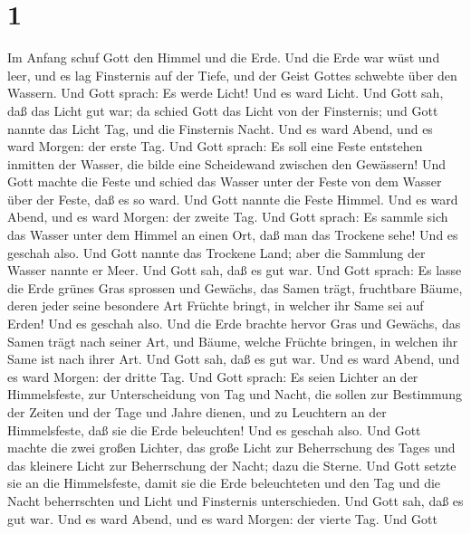 \hypertarget{section}{%
\section{1}\label{section}}

 Im Anfang schuf Gott den Himmel und die Erde.
 Und die Erde war wüst und leer, und es lag Finsternis auf
der Tiefe, und der Geist Gottes schwebte über den Wassern.
 Und Gott sprach: Es werde Licht! Und es ward Licht.
 Und Gott sah, daß das Licht gut war; da schied Gott das
Licht von der Finsternis;  und Gott nannte das Licht Tag,
und die Finsternis Nacht. Und es ward Abend, und es ward Morgen: der
erste Tag.  Und Gott sprach: Es soll eine Feste entstehen
inmitten der Wasser, die bilde eine Scheidewand zwischen den Gewässern!
 Und Gott machte die Feste und schied das Wasser unter der
Feste von dem Wasser über der Feste, daß es so ward.  Und
Gott nannte die Feste Himmel. Und es ward Abend, und es ward Morgen: der
zweite Tag.  Und Gott sprach: Es sammle sich das Wasser
unter dem Himmel an einen Ort, daß man das Trockene sehe! Und es geschah
also.  Und Gott nannte das Trockene Land; aber die
Sammlung der Wasser nannte er Meer. Und Gott sah, daß es gut war.
 Und Gott sprach: Es lasse die Erde grünes Gras sprossen
und Gewächs, das Samen trägt, fruchtbare Bäume, deren jeder seine
besondere Art Früchte bringt, in welcher ihr Same sei auf Erden! Und es
geschah also.  Und die Erde brachte hervor Gras und
Gewächs, das Samen trägt nach seiner Art, und Bäume, welche Früchte
bringen, in welchen ihr Same ist nach ihrer Art. Und Gott sah, daß es
gut war.  Und es ward Abend, und es ward Morgen: der
dritte Tag.  Und Gott sprach: Es seien Lichter an der
Himmelsfeste, zur Unterscheidung von Tag und Nacht, die sollen zur
Bestimmung der Zeiten und der Tage und Jahre dienen,  und
zu Leuchtern an der Himmelsfeste, daß sie die Erde beleuchten! Und es
geschah also.  Und Gott machte die zwei großen Lichter,
das große Licht zur Beherrschung des Tages und das kleinere Licht zur
Beherrschung der Nacht; dazu die Sterne.  Und Gott setzte
sie an die Himmelsfeste, damit sie die Erde beleuchteten 
und den Tag und die Nacht beherrschten und Licht und Finsternis
unterschieden. Und Gott sah, daß es gut war.  Und es ward
Abend, und es ward Morgen: der vierte Tag.  Und Gott
